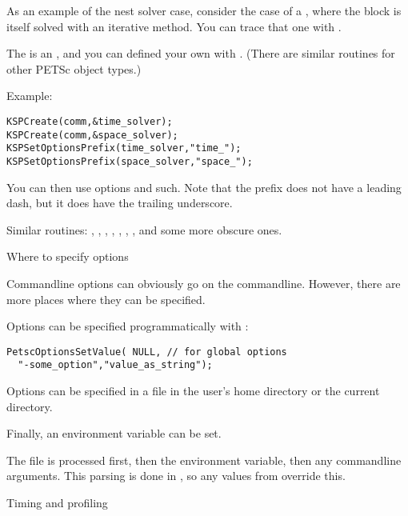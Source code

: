 As an example of the nest solver case, consider the case of a
, where the block is itself solved
with an iterative method. You can trace that one with
.

The  is an , and you can defined
your own with 
.
(There are similar routines for other PETSc object types.)

Example:
\begin{lstlisting}
KSPCreate(comm,&time_solver);
KSPCreate(comm,&space_solver);
KSPSetOptionsPrefix(time_solver,"time_");
KSPSetOptionsPrefix(space_solver,"space_");
\end{lstlisting}
You can then use options  and such.
Note that the prefix does not have a leading dash,
but it does have the trailing underscore.

\begin{raggedlist}
Similar routines:
  , 
  , 
  , 
  , 
  , 
  , 
  , 
and some more obscure ones.
\end{raggedlist}


 {Where to specify options}

Commandline options can obviously go on the commandline. However, there are more
places where they can be specified.

Options can be specified programmatically with
:
\begin{lstlisting}
PetscOptionsSetValue( NULL, // for global options
  "-some_option","value_as_string");
\end{lstlisting}

Options can be specified in a file  in the user's home directory
or the current directory.

Finally, an environment variable  can be set.

The  file is processed first, then the environment variable,
then any commandline arguments. This parsing is done in ,
so any values from  override this.

 {Timing and profiling}

